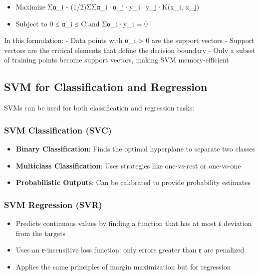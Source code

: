 \documentclass[
  letterpaper,
  DIV=11,
  numbers=noendperiod]{scrreprt}
\providecommand{\tightlist}{%
  \setlength{\itemsep}{0pt}\setlength{\parskip}{0pt}}\usepackage{longtable,booktabs,array}
\begin{document}
\begin{itemize}
\tightlist
\item
  Maximize Σα\_i - (1/2)ΣΣα\_i·α\_j·y\_i·y\_j·K(x\_i, x\_j)
\item
  Subject to 0 ≤ α\_i ≤ C and Σα\_i·y\_i = 0
\end{itemize}

In this formulation: - Data points with α\_i \textgreater{} 0 are the
support vectors - Support vectors are the critical elements that define
the decision boundary - Only a subset of training points become support
vectors, making SVM memory-efficient

\subsection{SVM for Classification and
Regression}\label{svm-for-classification-and-regression}

SVMs can be used for both classification and regression tasks:

\subsubsection{SVM Classification (SVC)}\label{svm-classification-svc}

\begin{itemize}
\tightlist
\item
  \textbf{Binary Classification}: Finds the optimal hyperplane to
  separate two classes
\item
  \textbf{Multiclass Classification}: Uses strategies like one-vs-rest
  or one-vs-one
\item
  \textbf{Probabilistic Outputs}: Can be calibrated to provide
  probability estimates
\end{itemize}

\subsubsection{SVM Regression (SVR)}\label{svm-regression-svr}

\begin{itemize}
\tightlist
\item
  Predicts continuous values by finding a function that has at most ε
  deviation from the targets
\item
  Uses an ε-insensitive loss function: only errors greater than ε are
  penalized
\item
  Applies the same principles of margin maximization but for regression
\end{itemize}
\end{document}
